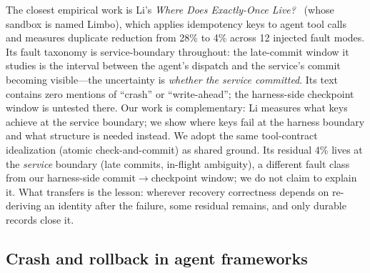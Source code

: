 \documentclass[10pt,journal,compsoc]{IEEEtran}
\begin{document}
The closest empirical work is Li's \emph{Where Does Exactly-Once Live?}~\cite{limbo2026}
(whose sandbox is named Limbo), which applies idempotency keys to agent tool calls and measures
duplicate reduction from 28\% to 4\% across 12 injected fault
modes. Its fault taxonomy is service-boundary throughout: the late-commit window it studies is
the interval between the agent's dispatch and the service's commit
becoming visible---the uncertainty is \emph{whether the service
committed}. Its text contains zero mentions of ``crash'' or
``write-ahead''; the harness-side checkpoint window is untested
there. Our work is complementary: Li measures what keys achieve
at the service boundary; we show where keys fail at the harness
boundary and what structure is needed instead. We adopt the same
tool-contract idealization (atomic check-and-commit) as shared
ground. Its residual 4\% lives at the \emph{service} boundary
(late commits, in-flight ambiguity), a different fault class from our harness-side
commit$\to$checkpoint window; we do not claim to explain it.
What transfers is the lesson: wherever recovery correctness
depends on re-deriving an identity after the failure, some
residual remains, and only durable records close it.

\subsection{Crash and rollback in agent frameworks}
\end{document}
